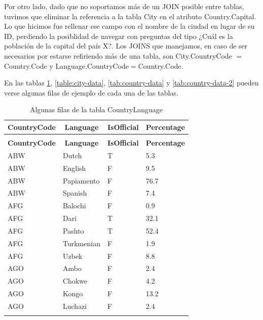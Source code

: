 Por otro lado, dado que no soportamos más de un JOIN posible entre tablas, tuvimos que eliminar la referencia a la tabla City en el atributo Country.Capital. Lo que hicimos fue rellenar ese campo con el nombre de la ciudad en lugar de su  ID, perdiendo la posiblidad de navegar con preguntas del tipo ¿Cuál es la población de la capital del país X?.
Los JOINS que manejamos, en caso de ser necesarios por estarse refiriendo más de una tabla, son City.CountryCode $=$ Country.Code y Language.CountryCode$=$Country.Code.

En las tablas \ref{table:countrylanguage-data}, \ref{table:city-data}, \ref{tab:country-data} y \ref{tab:country-data-2} pueden verse algunas filas de ejemplo de cada una de las tablas.

%
%
 \begin{longtable}{|l|l|l|l|}
 \hline  \multicolumn{1}{|c|}{\textbf{CountryCode}} & \multicolumn{1}{|c|}{\textbf{Language}} & \multicolumn{1}{|c|}{\textbf{IsOfficial}} & \multicolumn{1}{|c|}{\textbf{Percentage}} \\ \hline  \endfirsthead
\caption{Algunas filas de la tabla CountryLanguage (cont)} \\ \hline \multicolumn{1}{|c|}{\textbf{CountryCode}} & \multicolumn{1}{|c|}{\textbf{Language}} & \multicolumn{1}{|c|}{\textbf{IsOfficial}} & \multicolumn{1}{|c|}{\textbf{Percentage}} \\ \hline \hline \endhead \endfoot
ABW & Dutch & T & 5.3 \\ \hline
ABW & English & F & 9.5 \\ \hline
ABW & Papiamento & F & 76.7 \\ \hline
ABW & Spanish & F & 7.4 \\ \hline
AFG & Balochi & F & 0.9 \\ \hline
AFG & Dari & T & 32.1 \\ \hline
AFG & Pashto & T & 52.4 \\ \hline
AFG & Turkmenian & F & 1.9 \\ \hline
AFG & Uzbek & F & 8.8 \\ \hline
AGO & Ambo & F & 2.4 \\ \hline
AGO & Chokwe & F & 4.2 \\ \hline
AGO & Kongo & F & 13.2 \\ \hline
AGO & Luchazi & F & 2.4 \\ \hline
\caption{Algunas filas de la tabla CountryLanguage}
\label{table:countrylanguage-data}
\end{longtable}


